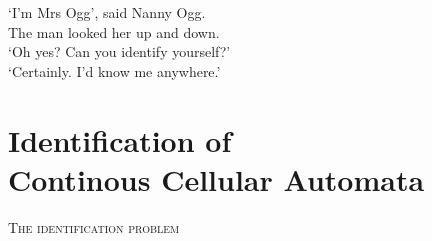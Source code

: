 
\begin{savequote}[99mm]
‘I’m Mrs Ogg’, said Nanny Ogg.\\
The man looked her up and down.\\
‘Oh yes? Can you identify yourself?’\\
‘Certainly. I’d know me anywhere.'\\
\end{savequote}


\chapter[Identification of Continous Cellular Automata]{Identification of\\Continous Cellular Automata}


\lettrine[lines=5, loversize=-0.1, lraise=0.1]{T}{he identification problem} 
